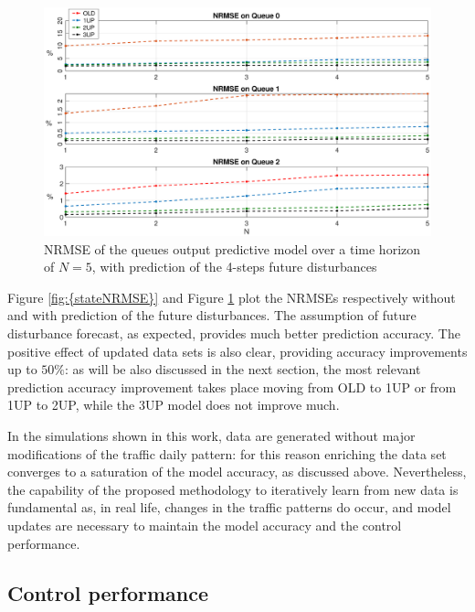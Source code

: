 \begin{figure}[th!]
	\centering
	\includegraphics[trim={120 0 120 0}, width=0.9\linewidth]{figure/Error_State_ddM4.eps}
	\caption{NRMSE of the queues output predictive model over a time horizon of $N=5$, with prediction of the 4-steps future disturbances}
	\label{fig:{stateNRMSEddM4}}
\end{figure}

Figure \ref{fig:{stateNRMSE}} and Figure \ref{fig:{stateNRMSEddM4}} plot the NRMSEs respectively without and with prediction of the future disturbances. The assumption of future disturbance forecast, as expected, provides much better prediction accuracy. The positive effect of updated data sets is also clear, providing accuracy improvements up to $50 \%$: as will be also discussed in the next section, the most relevant prediction accuracy improvement takes place moving from OLD to 1UP or from 1UP to 2UP, while the 3UP model does not improve much.

\begin{remark}
In the simulations shown in this work, data are generated without major modifications of the traffic daily pattern: for this reason enriching the data set converges to a saturation of the model accuracy, as discussed above. Nevertheless, the capability of the proposed methodology to iteratively learn from new data is fundamental as, in real life, changes in the traffic patterns do occur, and model updates are necessary to maintain the model accuracy and the control performance. 
\end{remark}


\subsection{Control performance}

